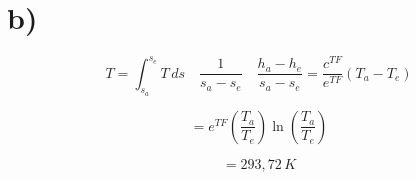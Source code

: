 

\section*{b)}

\[
T = \int_{s_a}^{s_e} T \, ds \quad \frac{1}{s_a - s_e} \quad \frac{h_a - h_e}{s_a - s_e} = \frac{c^{TF}}{e^{TF}} (T_a - T_e)
\]

\[
= e^{TF} \left( \frac{T_a}{T_e} \right) \ln \left( \frac{T_a}{T_e} \right)
\]

\[
= 293,72 \, K
\]